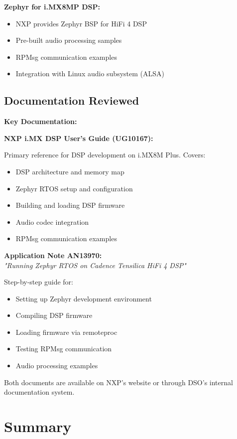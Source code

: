 \documentclass[12pt,a4paper]{report}
\begin{document}
\textbf{Zephyr for i.MX8MP DSP:}
\begin{itemize}
    \item NXP provides Zephyr BSP for HiFi 4 DSP
    \item Pre-built audio processing samples
    \item RPMsg communication examples
    \item Integration with Linux audio subsystem (ALSA)
\end{itemize}

\subsection{Documentation Reviewed}

\begin{docref}
\textbf{Key Documentation:}

\textbf{NXP i.MX DSP User's Guide (UG10167):}

Primary reference for DSP development on i.MX8M Plus. Covers:
\begin{itemize}
    \item DSP architecture and memory map
    \item Zephyr RTOS setup and configuration
    \item Building and loading DSP firmware
    \item Audio codec integration
    \item RPMsg communication examples
\end{itemize}

\textbf{Application Note AN13970:} \\
\textit{"Running Zephyr RTOS on Cadence Tensilica HiFi 4 DSP"}

Step-by-step guide for:
\begin{itemize}
    \item Setting up Zephyr development environment
    \item Compiling DSP firmware
    \item Loading firmware via remoteproc
    \item Testing RPMsg communication
    \item Audio processing examples
\end{itemize}

Both documents are available on NXP's website or through DSO's internal documentation system.
\end{docref}

\section{Summary}
\end{document}
